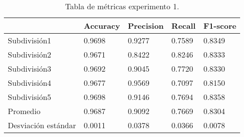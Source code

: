 \begin{table}[H]
\centering
\begin{tabular}{|l|llll|}
\hline
              & Accuracy &     Precision &     Recall  &   F1-score \\ \hline

Subdivisión1            &       0.9698  &       0.9277  &       0.7589  &       0.8349  \\ 
Subdivisión2            &       0.9671  &       0.8422  &       0.8246  &       0.8333  \\ 
Subdivisión3            &       0.9692  &       0.9045  &       0.7720  &       0.8330  \\ 
Subdivisión4            &       0.9677  &       0.9569  &       0.7097  &       0.8150  \\ 
Subdivisión5            &       0.9698  &       0.9146  &       0.7694  &       0.8358  \\ \hline
Promedio                &       0.9687  &       0.9092  &       0.7669  &       0.8304  \\ \hline
Desviación estándar     &       0.0011  &       0.0378  &       0.0366  &       0.0078  \\ \hline

\end{tabular}
\caption{Tabla de métricas experimento 1.}
		     \label{tab:exp1}
\end{table}